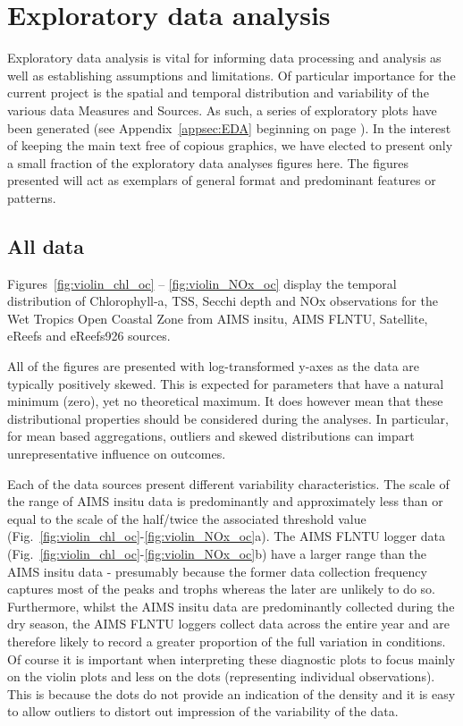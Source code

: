 \section{Exploratory data analysis}

Exploratory data analysis is vital for informing data processing and analysis as well as
establishing assumptions and limitations.  Of particular importance for the current project is the
spatial and temporal distribution and variability of the various data Measures and Sources.  As
such, a series of exploratory plots have been generated (see Appendix~\ref{appsec:EDA} beginning on
page \pageref{appsec:EDA}).  In the interest of keeping the main text free of copious graphics, we
have elected to present only a small fraction of the exploratory data analyses figures here.  The
figures presented will act as exemplars of general format and predominant features or patterns.

\subsection{All data}

Figures~\ref{fig:violin_chl_oc} -- \ref{fig:violin_NOx_oc} display the temporal distribution of
Chlorophyll-a, TSS, Secchi depth and NOx observations for the Wet Tropics Open Coastal Zone from
AIMS insitu, AIMS FLNTU, Satellite, eReefs and eReefs926 sources.

All of the figures are presented with log-transformed y-axes as the data are typically positively
skewed.  This is expected for parameters that have a natural minimum (zero), yet no theoretical
maximum.  It does however mean that these distributional properties should be considered during the
analyses.  In particular, for mean based aggregations, outliers and skewed distributions can impart
unrepresentative influence on outcomes.

Each of the data sources present different variability characteristics.  The scale of the range of
AIMS insitu data is predominantly and approximately less than or equal to the scale of the
half/twice the associated threshold value (Fig.~\ref{fig:violin_chl_oc}-\ref{fig:violin_NOx_oc}a).
The AIMS FLNTU logger data (Fig.~\ref{fig:violin_chl_oc}-\ref{fig:violin_NOx_oc}b) have a larger
range than the AIMS insitu data - presumably because the former data collection frequency captures
most of the peaks and trophs whereas the later are unlikely to do so.  Furthermore, whilst the AIMS
insitu data are predominantly collected during the dry season, the AIMS FLNTU loggers collect data
across the entire year and are therefore likely to record a greater proportion of the full variation
in conditions.  Of course it is important when interpreting these diagnostic plots to focus mainly
on the violin plots and less on the dots (representing individual observations).  This is because
the dots do not provide an indication of the density and it is easy to allow outliers to distort out
impression of the variability of the data.

